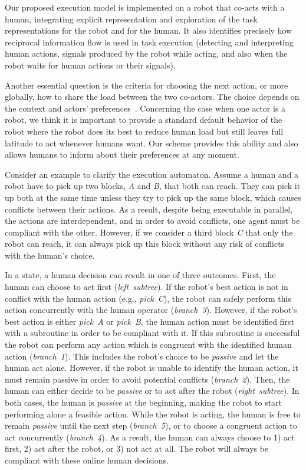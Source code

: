 Our proposed execution model is implemented on a robot that co-acts with a human, integrating explicit representation and exploration of the task representations for the robot and for the human. 
It also identifies precisely how reciprocal information flow is used in task execution (detecting and interpreting human actions, signals produced by the robot while acting, and also when the robot waits for human actions or their signals).

Another essential question is the criteria for choosing the next action, or more globally, how to share the load between the two co-actors. The choice depends on the context and actors' preferences~\cite{Gombolay-2015, Strachan-2020,Curioni-2022}. 
Concerning the case when one actor is a robot, we think it is important to provide a standard default behavior of the robot where the robot does its best to reduce human load but still leaves full latitude to act whenever humans want. 
Our scheme provides this ability and also allows humans to inform about their preferences at any moment.

Consider an example to clarify the execution automaton. 
Assume a human and a robot have to pick up two blocks, \textit{A} and \textit{B}, that both can reach. 
They can pick it up both at the same time unless they try to pick up the same block, which causes conflicts between their actions. 
As a result, despite being executable in parallel, the actions are interdependent, and in order to avoid conflicts, one agent must be compliant with the other. 
However, if we consider a third block \textit{C} that only the robot can reach, it can always pick up this block without any risk of conflicts with the human's choice. 

In a state, a human decision can result in one of three outcomes.
First, the human can choose to act first (\textit{left~subtree}).
If the robot's best action is not in conflict with the human action (e.g., \textit{pick~C}), the robot can safely perform this action concurrently with the human operator (\textit{branch~3}).
However, if the robot's best action is either \textit{pick~A} or \textit{pick~B}, the human action must be identified first with a subroutine in order to be compliant with it.
If this subroutine is successful the robot can perform any action which is congruent with the identified human action (\textit{branch~1}). 
This includes the robot's choice to be \textit{passive} and let the human act alone. 
However, if the robot is unable to identify the human action, it must remain passive in order to avoid potential conflicts (\textit{branch~2}). 
Then, the human can either decide to be \textit{passive} or to act after the robot (\textit{right~subtree}). 
In both cases, the human is \textit{passive} at the beginning, making the robot to start performing alone a feasible action. 
While the robot is acting, the human is free to remain \textit{passive} until the next step (\textit{branch~5}), or to choose a congruent action to act concurrently (\textit{branch~4}). 
As a result, the human can always choose to 1) act first, 2) act after the robot, or 3) not act at all. 
The robot will always be compliant with these online human decisions.

